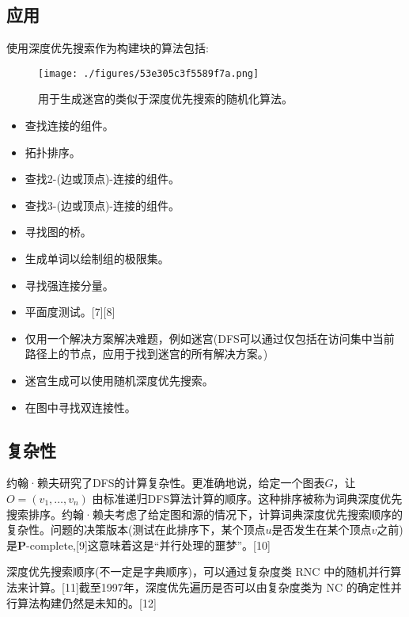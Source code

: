 \subsection{应用}
使用深度优先搜索作为构建块的算法包括:
\begin{figure}[ht]
\centering
\texttt{[image: ./figures/53e305c3f5589f7a.png]}
\caption{用于生成迷宫的类似于深度优先搜索的随机化算法。} \label{fig_SDYXSS_4}
\end{figure}
\begin{itemize}
\item 查找连接的组件。
\item 拓扑排序。
\item 查找2-(边或顶点)-连接的组件。
\item 查找3-(边或顶点)-连接的组件。
\item 寻找图的桥。
\item 生成单词以绘制组的极限集。
\item 寻找强连接分量。
\item 平面度测试。[7][8]
\item 仅用一个解决方案解决难题，例如迷宫(DFS可以通过仅包括在访问集中当前路径上的节点，应用于找到迷宫的所有解决方案。)
\item 迷宫生成可以使用随机深度优先搜索。
\item 在图中寻找双连接性。
\end{itemize}

\subsection{复杂性}
约翰·赖夫研究了DFS的计算复杂性。更准确地说，给定一个图表$G$，让$O= (v_1, \ldots, v_n)$ 由标准递归DFS算法计算的顺序。这种排序被称为词典深度优先搜索排序。约翰·赖夫考虑了给定图和源的情况下，计算词典深度优先搜索顺序的复杂性。问题的决策版本(测试在此排序下，某个顶点$u$是否发生在某个顶点$v$之前)是\textbf{P}-complete,[9]这意味着这是“并行处理的噩梦”。[10]

深度优先搜索顺序(不一定是字典顺序)，可以通过复杂度类 RNC 中的随机并行算法来计算。[11]截至1997年，深度优先遍历是否可以由复杂度类为 NC 的确定性并行算法构建仍然是未知的。[12]

